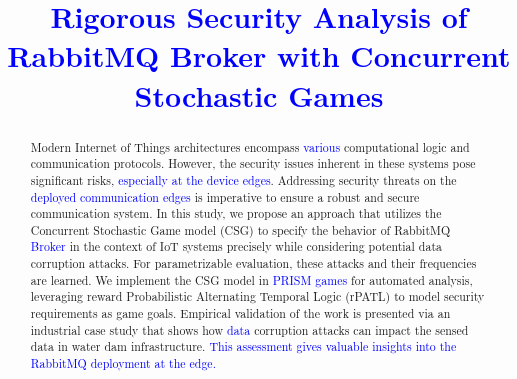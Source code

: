 \documentclass[3p,times,preprint,number,round]{elsarticle}
\theoremstyle{definition}
\newcommand{\cmt}[1] {\textcolor{blue}{#1}}
\begin{document}
\begin{frontmatter}




\title{\cmt{Rigorous Security Analysis of RabbitMQ Broker with Concurrent Stochastic Games}}










\begin{abstract}
Modern Internet of Things architectures encompass \cmt{various} computational logic and communication protocols. However, the security issues inherent in these systems pose significant risks, \cmt{especially at the device edges}. Addressing security threats on the \cmt{deployed communication edges} is imperative to ensure a robust and secure communication system. In this study, we propose an approach that utilizes the Concurrent Stochastic Game model (CSG) to specify the behavior of RabbitMQ \cmt{Broker} in the context of IoT systems precisely while considering potential data corruption attacks. For parametrizable evaluation, these attacks and their frequencies are learned. We implement the CSG model in \cmt{PRISM games} for automated analysis, leveraging reward Probabilistic Alternating Temporal Logic (rPATL) to model security requirements as game goals. Empirical validation of the work is presented via an industrial case study that shows how \cmt{data} corruption attacks can impact the sensed data in water dam infrastructure. \cmt{This assessment gives valuable insights into the RabbitMQ deployment at the edge.} 


\end{abstract}
\end{frontmatter}
\end{document}
